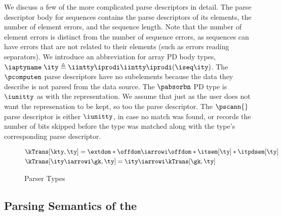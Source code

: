 We discuss a few of the more complicated parse descriptors in detail.
The parse descriptor body for sequences contains the parse descriptors of its elements,
the number of element errors, and the sequence length. Note that the
number of element errors is distinct from the number of sequence
errors, as sequences can have errors that are not related to their
elements (such as errors reading separators).  We introduce an
abbreviation for array PD body types, $\iaptyname \; \ity \triangleq
\iintty \iprodi \iintty \iprodi (\iseq \ity)$.
The $\pcomputen$ parse descriptors have no subelements because the
data they describe is not parsed from the data source.  The $\pabsorbn$ PD
type is $\iunitty$ as with the representation. We assume that just as
the user does not want the represenation to be kept, so too the parse
descriptor.  The $\pscann{}$ parse descriptor is either $\iunitty$, in case
no match was found, or records the number of bits skipped before the
type was matched along with the type's corresponding parse descriptor.


\begin{figure}
\small
\fbox{$\kTrans[\gk,\ty] = \ity$} 
    
\begin{align*}
  &\kTrans[\kty,\ty] = \extdom * \offdom \iarrowi \offdom * \itsem[\ty] * \itpdsem[\ty]
   \\
   &\kTrans[\ity \iarrowi \gk,\ty] = \ity \iarrowi \kTrans[\gk,\ty]
\end{align*}  
  \caption{Parser \Implang{} Types}
  \label{fig:parser-types}
\end{figure}

\subsection{Parsing Semantics of the \ddc{}}
\label{sec:parse-sem}

